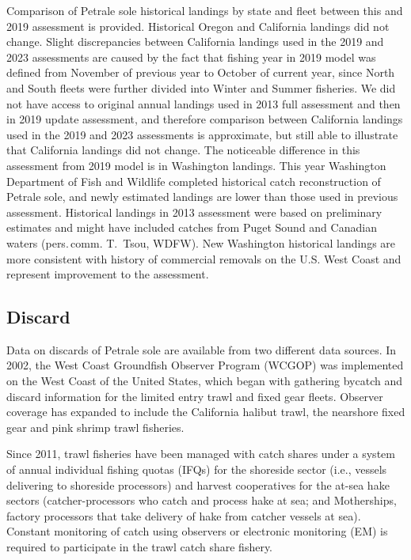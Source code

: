 \documentclass[
]{scrartcl}
\begin{document}
Comparison of Petrale sole historical landings by state and fleet
between this and 2019 assessment is provided. Historical Oregon and
California landings did not change. Slight discrepancies between
California landings used in the 2019 and 2023 assessments are caused by
the fact that fishing year in 2019 model was defined from November of
previous year to October of current year, since North and South fleets
were further divided into Winter and Summer fisheries. We did not have
access to original annual landings used in 2013 full assessment and then
in 2019 update assessment, and therefore comparison between California
landings used in the 2019 and 2023 assessments is approximate, but still
able to illustrate that California landings did not change. The
noticeable difference in this assessment from 2019 model is in
Washington landings. This year Washington Department of Fish and
Wildlife completed historical catch reconstruction of Petrale sole, and
newly estimated landings are lower than those used in previous
assessment. Historical landings in 2013 assessment were based on
preliminary estimates and might have included catches from Puget Sound
and Canadian waters (pers.\,comm. T.\ Tsou, WDFW). New Washington
historical landings are more consistent with history of commercial
removals on the U.S. West Coast and represent improvement to the
assessment.

\subsection{Discard}\label{discard}

Data on discards of Petrale sole are available from two different data
sources. In 2002, the West Coast Groundfish Observer Program (WCGOP) was
implemented on the West Coast of the United States, which began with
gathering bycatch and discard information for the limited entry trawl
and fixed gear fleets. Observer coverage has expanded to include the
California halibut trawl, the nearshore fixed gear and pink shrimp trawl
fisheries.

Since 2011, trawl fisheries have been managed with catch shares under a
system of annual individual fishing quotas (IFQs) for the shoreside
sector (i.e., vessels delivering to shoreside processors) and harvest
cooperatives for the at-sea hake sectors (catcher-processors who catch
and process hake at sea; and Motherships, factory processors that take
delivery of hake from catcher vessels at sea). Constant monitoring of
catch using observers or electronic monitoring (EM) is required to
participate in the trawl catch share fishery.
\end{document}
